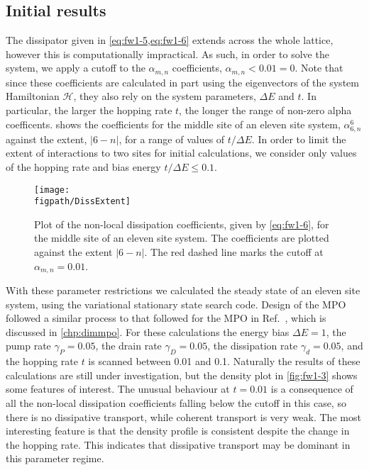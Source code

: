 \subsection{Initial results}
The dissipator given in \cref{eq:fw1-5,eq:fw1-6} extends across the whole lattice, however this is computationally impractical. As such, in order to solve the system, we apply a cutoff to the \(\alpha_{m,n}\) coefficients, \(\alpha_{m,n} < 0.01 = 0\). Note that since these coefficients are calculated in part using the eigenvectors of the system Hamiltonian \(\mathcal{H}\), they also rely on the system parameters, \(\Delta E\) and \(t\). In particular, the larger the hopping rate \(t\), the longer the range of non-zero alpha coefficents.  shows the coefficients for the middle site of an eleven site system, \(\alpha_{6,n}^{6}\) against the extent, \(|6-n|\), for a range of values of \( t / \Delta E\). In order to limit the extent of interactions to two sites for initial calculations, we consider only values of the hopping rate and bias energy \(t / \Delta E \leq 0.1\). 

\begin{figure}[ht!]
	\centering
	\texttt{[image: \\figpath/DissExtent]}
	\caption{\label{fig:fw1-2}Plot of the non-local dissipation coefficients, given by \cref{eq:fw1-6}, for the middle site of an eleven site system. The coefficients are plotted against the extent \(|6-n|\). The red dashed line marks the cutoff at \(\alpha_{m,n} = 0.01\).}
\end{figure}

With these parameter restrictions we calculated the steady state of an eleven site system, using the variational stationary state search code. Design of the MPO followed a similar process to that followed for the MPO in Ref.~\cite{Owen2017}, which is discussed in \cref{chp:dimmpo}. For these calculations the energy bias \(\Delta E = 1\), the pump rate \(\gamma_{P} = 0.05\), the drain rate \(\gamma_{D} = 0.05\), the dissipation rate \(\gamma_{d} = 0.05\), and the hopping rate \(t\) is scanned between 0.01 and 0.1. Naturally the results of these calculations are still under investigation, but the density plot in \cref{fig:fw1-3} shows some features of interest. The unusual behaviour at \(t=0.01\) is a consequence of all the non-local dissipation coefficients falling below the cutoff in this case, so there is no dissipative transport, while coherent transport is very weak. The most interesting feature is that the density profile is consistent despite the change in the hopping rate. This indicates that dissipative transport may be dominant in this parameter regime.
 

